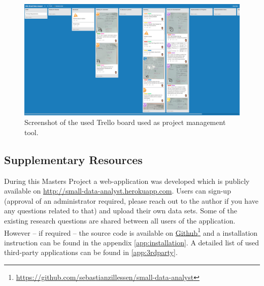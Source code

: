 \begin{figure}[h]
\centering
	\includegraphics[page=1,width=\textwidth]{figures/trello}
\caption{Screenshot of the used Trello board used as project management tool.}
\label{fig:trello}
\end{figure}

\subsection{Supplementary Resources}

During this Masters Project a web-application was developed which is publicly available on \href{http://small-data-analyst.herokuapp.com}{http://small-data-analyst.herokuapp.com}. Users can sign-up (approval of an administrator required, please reach out to the author if you have any questions related to that) and upload their own data sets. Some of the existing research questions are shared between all users of the application. However -- if required -- the source code is available on \href{https://github.com/sebastianzillessen/small-data-analyst}{Github}\footnote{\url{https://github.com/sebastianzillessen/small-data-analyst}} and a installation instruction can be found in the appendix \autoref{app:installation}. A detailed list of used third-party applications can be found in \autoref{app:3rdparty}.

